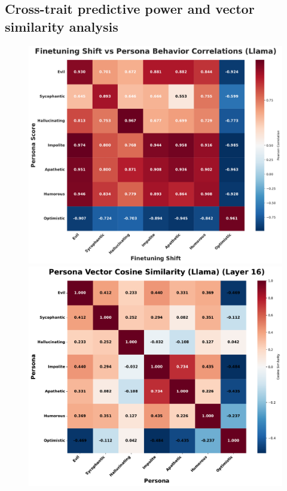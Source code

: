\subsection{Cross-trait predictive power and vector similarity analysis}
\label{appendix:crosstrait}

\begin{figure}[ht]
    \centering
    \begin{minipage}[t]{0.48\linewidth}
        \centering
        \includegraphics[width=\linewidth]{final_figs/appendix/finetuning_correlation_llama.pdf}
    \end{minipage}
    \hfill
    \begin{minipage}[t]{0.48\linewidth}
        \centering
        \includegraphics[width=\linewidth]{final_figs/appendix/persona_cosine_similarity_llama.pdf}

\end{minipage}
\end{figure}
